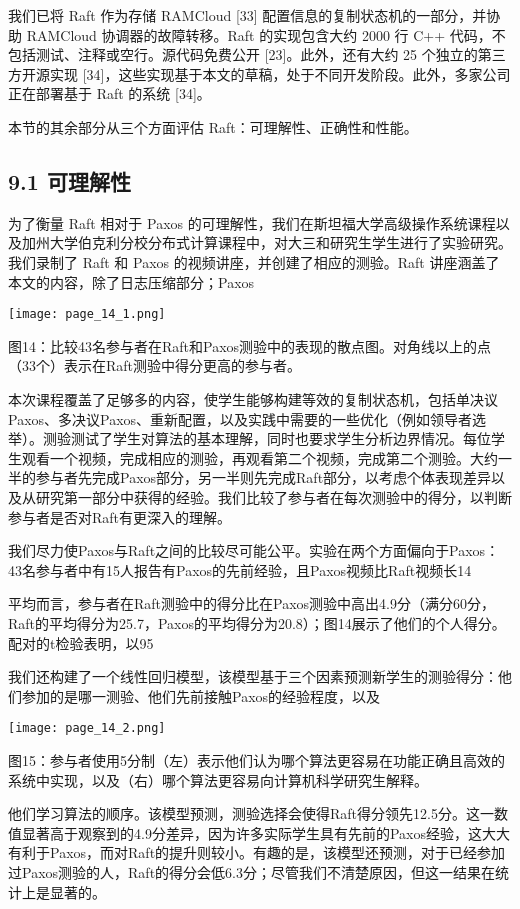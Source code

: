 \documentclass[12pt,a4paper]{report} %
\begin{document}
我们已将 Raft 作为存储 RAMCloud [33] 配置信息的复制状态机的一部分，并协助 RAMCloud 协调器的故障转移。Raft 的实现包含大约 2000 行 C++ 代码，不包括测试、注释或空行。源代码免费公开 [23]。此外，还有大约 25 个独立的第三方开源实现 [34]，这些实现基于本文的草稿，处于不同开发阶段。此外，多家公司正在部署基于 Raft 的系统 [34]。

本节的其余部分从三个方面评估 Raft：可理解性、正确性和性能。

\subsection*{9.1 可理解性}

为了衡量 Raft 相对于 Paxos 的可理解性，我们在斯坦福大学高级操作系统课程以及加州大学伯克利分校分布式计算课程中，对大三和研究生学生进行了实验研究。我们录制了 Raft 和 Paxos 的视频讲座，并创建了相应的测验。Raft 讲座涵盖了本文的内容，除了日志压缩部分；Paxos
\begin{center}
\texttt{[image: page\_14\_1.png]}
\end{center}
\begin{center} 图14：比较43名参与者在Raft和Paxos测验中的表现的散点图。对角线以上的点（33个）表示在Raft测验中得分更高的参与者。

\end{center} 本次课程覆盖了足够多的内容，使学生能够构建等效的复制状态机，包括单决议Paxos、多决议Paxos、重新配置，以及实践中需要的一些优化（例如领导者选举）。测验测试了学生对算法的基本理解，同时也要求学生分析边界情况。每位学生观看一个视频，完成相应的测验，再观看第二个视频，完成第二个测验。大约一半的参与者先完成Paxos部分，另一半则先完成Raft部分，以考虑个体表现差异以及从研究第一部分中获得的经验。我们比较了参与者在每次测验中的得分，以判断参与者是否对Raft有更深入的理解。

我们尽力使Paxos与Raft之间的比较尽可能公平。实验在两个方面偏向于Paxos：43名参与者中有15人报告有Paxos的先前经验，且Paxos视频比Raft视频长14%

平均而言，参与者在Raft测验中的得分比在Paxos测验中高出4.9分（满分60分，Raft的平均得分为25.7，Paxos的平均得分为20.8）；图14展示了他们的个人得分。配对的t检验表明，以95%

我们还构建了一个线性回归模型，该模型基于三个因素预测新学生的测验得分：他们参加的是哪一测验、他们先前接触Paxos的经验程度，以及

\begin{center}
\texttt{[image: page\_14\_2.png]}
\end{center}
\begin{center} 图15：参与者使用5分制（左）表示他们认为哪个算法更容易在功能正确且高效的系统中实现，以及（右）哪个算法更容易向计算机科学研究生解释。

\end{center} 他们学习算法的顺序。该模型预测，测验选择会使得Raft得分领先12.5分。这一数值显著高于观察到的4.9分差异，因为许多实际学生具有先前的Paxos经验，这大大有利于Paxos，而对Raft的提升则较小。有趣的是，该模型还预测，对于已经参加过Paxos测验的人，Raft的得分会低6.3分；尽管我们不清楚原因，但这一结果在统计上是显著的。
\end{document}
